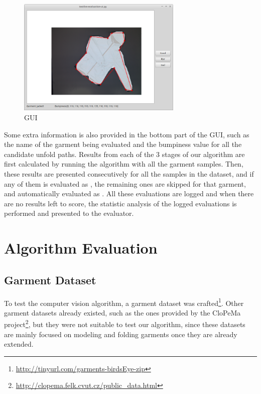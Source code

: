 \begin{figure}[thpb]
    \centering
    \includegraphics[width=0.7\textwidth]
    {figures/evaluation-gui.png}
    \caption[GUI]
    {GUI}
    \label{fig:gui}
\end{figure}


Some extra information is also provided in the bottom part of the GUI, such as the name of the garment being evaluated and the bumpiness value for all the candidate unfold paths. Results from each of the 3 stages of our algorithm are first calculated by running the algorithm with all the garment samples. Then, these results are presented consecutively for all the samples in the dataset, and if any of them is evaluated as \fail{}, the remaining ones are skipped for that garment, and automatically evaluated as \discarded{}. All these evaluations are logged and when there are no results left to score, the statistic analysis of the logged evaluations is performed and presented to the evaluator. 

\section{Algorithm Evaluation}
\label{experiments:evaluation}


\subsection{Garment Dataset}
\label{experiments:dataset}

To test the computer vision algorithm, a garment dataset was crafted\footnote{\url{http://tinyurl.com/garments-birdsEye-zip}}. Other garment datasets already existed, such as the ones provided by the CloPeMa project\footnote{\url{http://clopema.felk.cvut.cz/public_data.html}}, but they were not suitable to test our algorithm, since these datasets are mainly focused on modeling and folding garments once they are already extended. 


